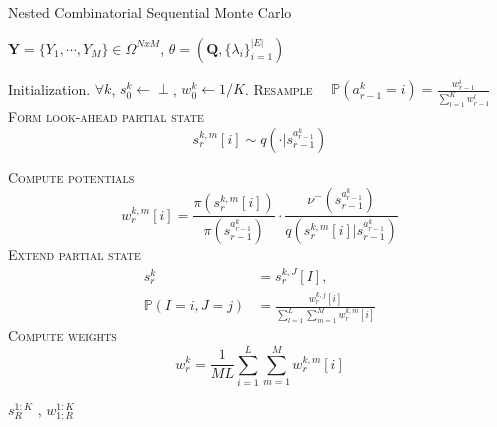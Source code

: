 \documentclass[accepted]{uai2021} %
\theoremstyle{definition}
\begin{document}
\begin{algorithm}[tb]
   \caption{Nested Combinatorial Sequential Monte Carlo}
   \label{alg:ncsmc}
    \begin{algorithmic}
    {$\mathbf{Y} = \{Y_1,\cdots,Y_M \} \in \Omega^{NxM}$,  $\theta = (\mathbf{Q},\{\lambda_i\}_{i=1}^{|E|})$}
   \end{algorithmic}
   \begin{algorithmic}[1]
   \STATE Initialization. $\forall k$, $s_{0}^k\leftarrow \perp$, $w_{0}^k\leftarrow 1/K$. 
    \STATE \textsc{Resample}~~ %
    $\mathbb{P}(a_{r-1}^k = i) = \frac{w_{r-1}^i}{\sum_{l=1}^K w_{r-1}^l}$
   \STATE \textsc{Form look-ahead partial state}
   \[ s_{r}^{k,m}[i] \sim q(\cdot|s_{r-1}^{a_{r-1}^k}) \] 
   
   \STATE \textsc{Compute potentials} \[ w_{r}^{k,m}[i] =  \frac{\pi(s_{r}^{k,m}[i])}{\pi(s_{r-1}^{a_{r-1}^k})}\cdot \frac{\nu^{-}(s_{r-1}^{a_{r-1}^k})}{q(s_{r}^{k,m}[i]|s_{r-1}^{a_{r-1}^k})} 
   \]
   \ENDFOR
   \ENDFOR
   \STATE \textsc{Extend partial state}
   \begin{align*}
      s_r^k &= s_r^{k,J}[I], \\
      \mathbb{P}(I = i, J=j) &= \frac{w_r^{k,j}[i]}{\sum_{l=1}^L \sum_{m=1}^M w_r^{k,m}[i]}
   \end{align*}%
    \STATE \textsc{Compute weights} \[
    w_r^k = \frac{1}{ML}\sum_{i=1}^L \sum_{m=1}^M w_r^{k,m}[i] 
    \]
   \ENDFOR
   \ENDFOR
    \end{algorithmic}
    \begin{algorithmic}
    $s_{R}^{1:K}$ , $w_{1:R}^{1:K}$
   \end{algorithmic}
    
\end{algorithm}
\end{document}
